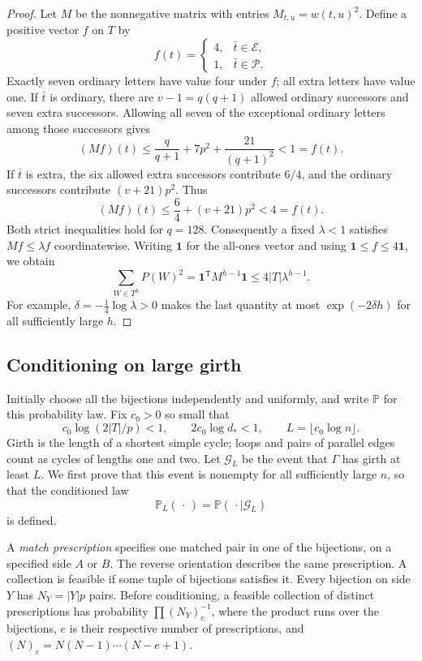 \begin{proof}
Let \(M\) be the nonnegative matrix with entries
\(M_{t,u}=w(t,u)^2\).  Define a positive vector \(f\) on \(T\) by
\[
 f(t)=\begin{cases}4,&\bar t\in\mathcal E,\\1,&\bar t\in\mathcal P.
 \end{cases}
\]
Exactly seven ordinary letters have value four under \(f\); all
extra letters have value one.  If \(\bar t\) is ordinary, there are
\(v-1=q(q+1)\) allowed ordinary successors and seven extra
successors.  Allowing all seven of the exceptional ordinary letters
among those successors gives
\[
 (Mf)(t)\le
 \frac{q}{q+1}+7p^2+\frac{21}{(q+1)^2}<1=f(t).
\]
If \(\bar t\) is extra, the six allowed extra successors contribute
\(6/4\), and the ordinary successors contribute \((v+21)p^2\).
Thus
\[
 (Mf)(t)\le\frac64+(v+21)p^2<4=f(t).
\]
Both strict inequalities hold for \(q=128\).  Consequently a fixed
\(\lambda<1\) satisfies \(Mf\le\lambda f\) coordinatewise.
Writing \(\mathbf1\) for the all-ones vector and using
\(\mathbf1\le f\le4\mathbf1\), we obtain
\[
 \sum_{W\in T^h}P(W)^2
 =\mathbf1^{\mathsf T}M^{h-1}\mathbf1
 \le4|T|\lambda^{h-1}.
\]
For example, \(\delta=-\tfrac14\log\lambda>0\) makes the last
quantity at most \(\exp(-2\delta h)\) for all sufficiently large
\(h\).
\end{proof}

\subsection{Conditioning on large girth}

Initially choose all the bijections independently and uniformly, and
write \(\mathbb P\) for this probability law.  Fix \(c_0>0\) so small
that
\begin{equation}\label{eq:girth-scale}
 c_0\log(2|T|/p)<1,\qquad 2c_0\log d_*<1,
 \qquad L=\lfloor c_0\log n\rfloor.
\end{equation}
Girth is the length of a shortest simple cycle; loops and pairs of
parallel edges count as cycles of lengths one and two.  Let
\(\mathcal G_L\) be the event that \(\Gamma\) has girth at least
\(L\).  We first prove that this event is nonempty for all sufficiently
large \(n\), so that the conditioned law
\[
 \mathbb P_L(\,\cdot\,)=\mathbb P(\,\cdot\mid\mathcal G_L)
\]
is defined.

A \emph{match prescription} specifies one matched pair in one of the
bijections, on a specified side \(A\) or \(B\).  The reverse
orientation describes the same prescription.  A collection is feasible
if some tuple of bijections satisfies it.  Every bijection on side
\(Y\) has \(N_Y=|Y|p\) pairs.  Before conditioning, a feasible
collection of distinct prescriptions has probability
\(\prod (N_Y)_{e}^{-1}\), where the product runs over the bijections,
\(e\) is their respective number of prescriptions, and
\((N)_e=N(N-1)\cdots(N-e+1)\).


